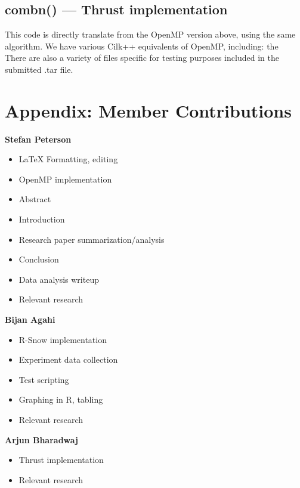 \documentclass[titlepage, 11pt]{article}
\begin{document}
\subsection{combn() --- Thrust implementation}

This code is directly translate from the OpenMP version above, using the same algorithm. We have various Cilk++ equivalents of OpenMP, including: the 
\\


There are also a variety of files specific for testing purposes included in the submitted .tar file.

\newpage
\section{Appendix: Member Contributions}

\textbf{Stefan Peterson}
\begin{itemize}
	\item \LaTeX{} Formatting, editing
	\item OpenMP implementation
	\item Abstract
	\item Introduction
	\item Research paper summarization/analysis
	\item Conclusion
	\item Data analysis writeup
	\item Relevant research
\end{itemize}

\textbf{Bijan Agahi}
\begin{itemize}
	\item R-Snow implementation
	\item Experiment data collection
	\item Test scripting
	\item Graphing in R, tabling
	\item Relevant research
\end{itemize}

\textbf{Arjun Bharadwaj}
\begin{itemize}
	\item Thrust implementation
	\item Relevant research
\end{itemize}
\end{document}
